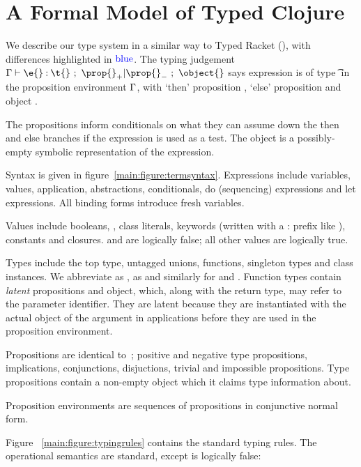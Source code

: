 \section{A Formal Model of Typed Clojure}

We describe our type system in a similar way to Typed Racket (\citet{TF10}),
with differences highlighted in $\mathbin{\textcolor{blue}{\text{blue}}}$.
The typing judgement 
$
{\judgement   {\propenv}
              {\hastype {\e{}} {\t{}}}
  {\filterset {\thenprop {\prop{}}}
              {\elseprop {\prop{}}}}
  {\object{}}}
$
says expression \e{} is of type \t{} in the 
proposition environment $\Gamma{}$, with 
`then' proposition {\thenprop {\prop{}}}, `else' proposition {\elseprop {\prop{}}}
and object \object{}.

The propositions inform conditionals on what they can assume down the then and else
branches if the expression is used as a test.
The object is a possibly-empty symbolic representation of the expression.

Syntax is given in figure~\ref{main:figure:termsyntax}. Expressions include variables, values,
application, abstractions, conditionals, do (sequencing) expressions and let expressions.
All binding forms introduce fresh variables.

Values include booleans, \nil{}, class literals, keywords (written with a : prefix like ), 
constants and closures.  \false{} and \nil{} are logically false; all other values are logically true.

Types include the top type, untagged unions, functions, singleton types
and class instances. We abbreviate \EmptyUnion{} as \Bot{}, {\ValueNil} as \Nil{} and similarly
for \True and \False.
Function types contain \emph{latent} propositions and object, which, along with the return type,
may refer to the parameter identifier. They are latent because they are instantiated with the
actual object of the argument in applications before they are used in the proposition environment.

Propositions are identical to~\cite{TF10}; positive and negative type propositions, implications,
conjunctions, disjuctions, trivial and impossible propositions.
Type propositions contain a non-empty object which it claims type information about.

Proposition environments are sequences of propositions in conjunctive normal form.

Figure ~\ref{main:figure:typingrules} contains the standard typing rules.
The operational semantics are standard, except \nil{} is logically false:

